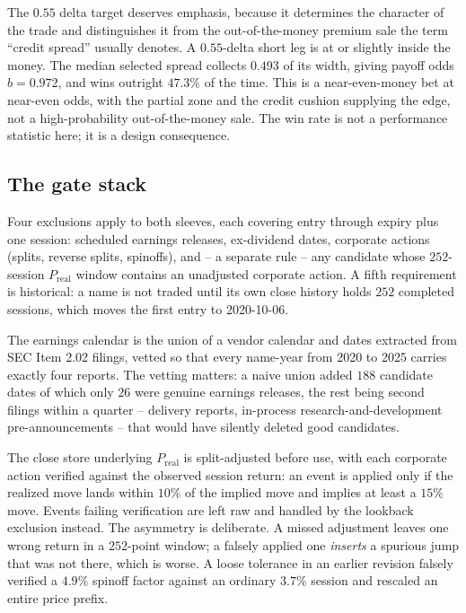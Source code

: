 \documentclass[11pt]{article}
\newcommand{\Preal}{P_{\mathrm{real}}}
\begin{document}
The $0.55$ delta target deserves emphasis, because it determines the character
of the trade and distinguishes it from the out-of-the-money premium sale the
term ``credit spread'' usually denotes. A $0.55$-delta short leg is at or slightly inside the money. The
median selected spread collects $0.493$ of its width, giving payoff odds
$b = 0.972$, and wins outright $47.3\%$ of the time. This is a near-even-money
bet at near-even odds, with the partial zone and the credit cushion supplying
the edge, not a high-probability out-of-the-money sale. The win rate is not a
performance statistic here; it is a design consequence.

\subsection{The gate stack}

Four exclusions apply to both sleeves, each covering entry through expiry plus
one session: scheduled earnings releases, ex-dividend dates, corporate actions
(splits, reverse splits, spinoffs), and -- a separate rule -- any candidate
whose $252$-session $\Preal$ window contains an unadjusted corporate action.
A fifth requirement is historical: a name is not traded until its own close
history holds $252$ completed sessions, which moves the first entry to
2020-10-06.

The earnings calendar is the union of a vendor calendar and dates extracted
from SEC Item 2.02 filings, vetted so that every name-year from 2020 to 2025
carries exactly four reports. The vetting matters: a naive union added $188$
candidate dates of which only $26$ were genuine earnings releases, the rest
being second filings within a quarter -- delivery reports, in-process
research-and-development pre-announcements -- that would have silently deleted
good candidates.

The close store underlying $\Preal$ is split-adjusted before use, with each
corporate action verified against the observed session return: an event is
applied only if the realized move lands within $10\%$ of the implied move and
implies at least a $15\%$ move. Events failing verification are left raw and
handled by the lookback exclusion instead. The asymmetry is deliberate. A
missed adjustment leaves one wrong return in a $252$-point window; a falsely
applied one \emph{inserts} a spurious jump that was not there, which is worse.
A loose tolerance in an earlier revision falsely verified a $4.9\%$ spinoff
factor against an ordinary $3.7\%$ session and rescaled an entire price
prefix.
\end{document}
